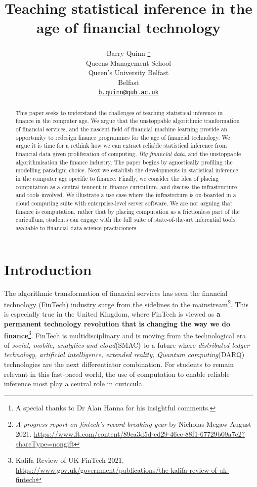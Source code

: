 \documentclass{article}
\title{Teaching statistical inference in the age of financial technology}
\author{
    Barry Quinn
    \thanks{A special thanks to Dr Alan Hanna for his insightful comments.}
   \\
    Queens Management School \\
    Queen's University Belfast \\
  Belfast \\
  \texttt{\href{mailto:b.quinn@qub.ac.uk}{\nolinkurl{b.quinn@qub.ac.uk}}} \\
  }
\begin{document}
\maketitle

\def\tightlist{}


\begin{abstract}
This paper seeks to understand the challenges of teaching statistical
inference in finance in the computer age. We argue that the unstoppable
algorithmic tranformation of financial services, and the nascent field
of financial machine learning provide an opportunity to redesign finance
programmes for the age of financial technology. We argue it is time for
a rethink how we can extract reliable statistical inference from
financial data given proliferation of computing, \emph{Big financial
data}, and the unstoppable algorithmisation the finance industry. The
paper begins by agnostically profiling the modelling paradigm choice.
Next we establish the developments in statistical inference in the
computer age specific to finance. Finally, we consider the idea of
placing computation as a central tennent in finance curicullum, and
discuss the infrastructure and tools involved. We illustrate a use case
where the infrastrcture is on-boarded in a cloud computing suite with
enterprise-level server software. We are not arguing that finance is
computation, rather that by placing computation as a frictionless part
of the curicullum, students can engage with the full suite of
state-of-the-art inferential tools avaliable to financial data science
practicioners.
\end{abstract}


\hypertarget{introduction}{%
\section{Introduction}\label{introduction}}

The algorithmic transformation of financial services has seen the
financial technology (FinTech) industry surge from the sidelines to the
mainstream\footnote{\emph{A progress report on fintech's record-breaking
  year} by Nicholas Megaw August 2021.
  \url{https://www.ft.com/content/89ea3d5d-cd29-46ec-88f1-67729b09a7c2?shareType=nongift}}.
This is especially true in the United Kingdom, where FinTech is viewed
as \textbf{a permanent technology revolution that is changing the way we
do finance}\footnote{Kalifa Review of UK FinTech 2021,
  \url{https://www.gov.uk/government/publications/the-kalifa-review-of-uk-fintech}}.
FinTech is multidisciplinary and is moving from the technological era of
\emph{social, mobile, analytics and cloud}(SMAC) to a future where
\emph{distributed ledger technology, artificial intelligence, extended
reality, Quantum computing}(DARQ) technologies are the next
differentiator combination. For students to remain relevant in this
fast-paced world, the use of computation to enable reliable inference
most play a central role in curiccula.
\end{document}
